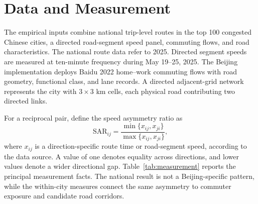 \documentclass[12pt]{article}
\begin{document}
\section{Data and Measurement}

The empirical inputs combine national trip-level routes in the top 100 congested Chinese cities, a directed road-segment speed panel, commuting flows, and road characteristics. The national route data refer to 2025. Directed segment speeds are measured at ten-minute frequency during May 19--25, 2025. The Beijing implementation deploys Baidu 2022 home--work commuting flows with road geometry, functional class, and lane records. A directed adjacent-grid network represents the city with $3\times3$ km cells, each physical road contributing two directed links.

For a reciprocal pair, define the speed asymmetry ratio as
\begin{equation}
  \mathrm{SAR}_{ij}=\frac{\min\{x_{ij},x_{ji}\}}{\max\{x_{ij},x_{ji}\}},
  \label{eq:sar}
\end{equation}
where $x_{ij}$ is a direction-specific route time or road-segment speed, according to the data source. A value of one denotes equality across directions, and lower values denote a wider directional gap. Table~\ref{tab:measurement} reports the principal measurement facts. The national result is not a Beijing-specific pattern, while the within-city measures connect the same asymmetry to commuter exposure and candidate road corridors.
\end{document}
